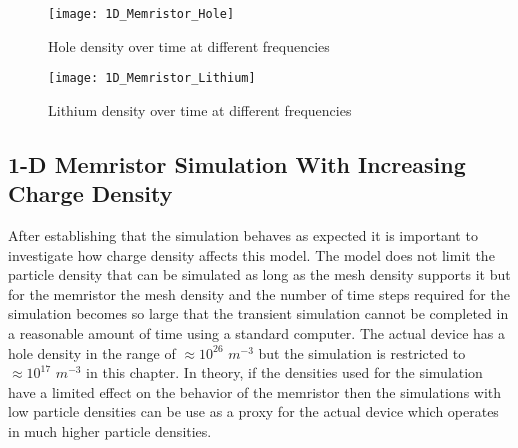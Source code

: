 \begin{doublespace}
\begin{figure}[!htp]
\centering
\texttt{[image: 1D\_Memristor\_Hole]}
\caption{Hole density over time at different frequencies} 
\label{Bowhole}
\end{figure}

\begin{figure}[!htp]
\centering
\texttt{[image: 1D\_Memristor\_Lithium]}
\caption{Lithium density over time at different frequencies} 
\label{Bowli}
\end{figure}


\clearpage
\subsection{1-D Memristor Simulation With Increasing Charge Density}

After establishing that the simulation behaves as expected it is important to investigate how charge density affects this model. The model does not limit the particle density that can be simulated as long as the mesh density supports it but for the memristor the mesh density and the number of time steps required for the simulation becomes so large that the transient simulation cannot be completed in a reasonable amount of time using a standard computer. The actual device has a hole density in the range of $ \approx 10^{26}$ $m^{-3}$ but the simulation is restricted to $\approx 10^{17}$ $m^{-3}$ in this chapter. In theory, if the densities used for the simulation  have a limited effect on the behavior of the memristor then the simulations with low particle densities can be use as a proxy for the actual device which operates in much higher particle densities.


\end{doublespace}
